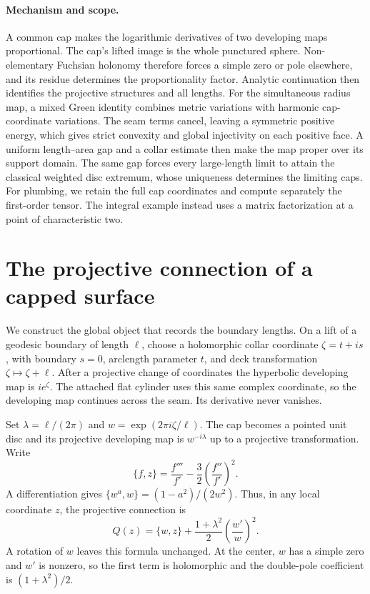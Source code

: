\documentclass[11pt,a4paper]{article}
\theoremstyle{definition}
\begin{document}
\paragraph{Mechanism and scope.}
A common cap makes the logarithmic derivatives of two developing maps proportional. The cap's lifted image is the whole punctured sphere. Non-elementary Fuchsian holonomy therefore forces a simple zero or pole elsewhere, and its residue determines the proportionality factor. Analytic continuation then identifies the projective structures and all lengths. For the simultaneous radius map, a mixed Green identity combines metric variations with harmonic cap-coordinate variations. The seam terms cancel, leaving a symmetric positive energy, which gives strict convexity and global injectivity on each positive face. A uniform length--area gap and a collar estimate then make the map proper over its support domain. The same gap forces every large-length limit to attain the classical weighted disc extremum, whose uniqueness determines the limiting caps. For plumbing, we retain the full cap coordinates and compute separately the first-order tensor. The integral example instead uses a matrix factorization at a point of characteristic two.

\section{The projective connection of a capped surface}
We construct the global object that records the boundary lengths. On a lift of a geodesic boundary of length $\ell$, choose a holomorphic collar coordinate $\zeta=t+is$, with boundary $s=0$, arclength parameter $t$, and deck transformation $\zeta\mapsto\zeta+\ell$. After a projective change of coordinates the hyperbolic developing map is $i e^\zeta$. The attached flat cylinder uses this same complex coordinate, so the developing map continues across the seam. Its derivative never vanishes.

Set $\lambda=\ell/(2\pi)$ and $w=\exp(2\pi i\zeta/\ell)$. The cap becomes a pointed unit disc and its projective developing map is $w^{-i\lambda}$ up to a projective transformation. Write
\[
 \{f,z\}=\frac{f'''}{f'}-\frac32\left(\frac{f''}{f'}\right)^2.
\]
A differentiation gives $\{w^a,w\}=(1-a^2)/(2w^2)$. Thus, in any local coordinate $z$, the projective connection is
\begin{equation}\label{eq:connection}
 Q(z)=\{w,z\}+\frac{1+\lambda^2}{2}\left(\frac{w'}w\right)^2.
\end{equation}
A rotation of $w$ leaves this formula unchanged. At the center, $w$ has a simple zero and $w'$ is nonzero, so the first term is holomorphic and the double-pole coefficient is $(1+\lambda^2)/2$.
\end{document}
